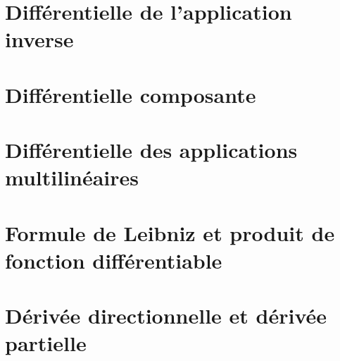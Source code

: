 \section{Différentielle de l'application inverse}

\section{Différentielle composante}

\section{Différentielle des applications multilinéaires}

\section{Formule de Leibniz et produit de fonction différentiable}

\section{Dérivée directionnelle et dérivée partielle}

